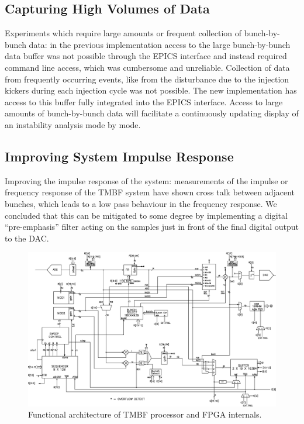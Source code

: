 \documentclass{JAC2003}
\begin{document}
\subsection{Capturing High Volumes of Data}

Experiments which require large amounts or frequent collection of bunch-by-bunch
data: in the previous implementation access to the large bunch-by-bunch data
buffer  was not possible through the EPICS interface and instead required
command line access, which was cumbersome and unreliable.  Collection of data
from frequently occurring events, like from the disturbance due to the injection
kickers during each injection cycle was not possible.  The new implementation
has access to this buffer fully integrated into the EPICS interface.  Access to
large amounts of bunch-by-bunch data will facilitate a continuously updating
display of an instability analysis mode by mode.


\subsection{Improving System Impulse Response}

Improving the impulse response of the system: measurements of the impulse or
frequency response of the TMBF system have shown cross talk between adjacent
bunches, which leads to a low pass behaviour in the frequency response.  We
concluded that this can be mitigated to some degree by implementing a digital
``pre-emphasis'' filter acting on the samples just in front of the final digital
output to the DAC.


\begin{figure}[!ht]
\includegraphics[width=\linewidth]{WEPC10f1}
\caption{Functional architecture of TMBF processor and FPGA internals.}
\label{fpga:architecture}
\end{figure}
\end{document}
